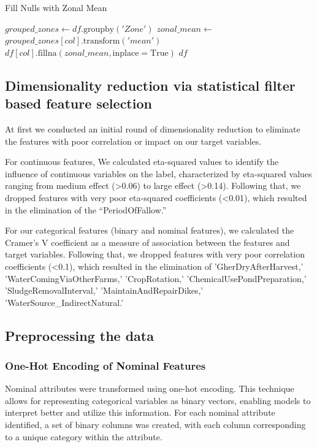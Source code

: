 \documentclass[journal,comsoc]{IEEEtran}
\begin{document}
\begin{algorithm}
\caption{Fill Nulls with Zonal Mean}
\begin{algorithmic}
\State
{}
    \State $grouped\_zones \gets df.\text{groupby}('Zone')$
    \State $zonal\_mean \gets$ \\
    \hspace{5em}$grouped\_zones[col].\text{transform}('mean')$
    \State $df[col].\text{fillna}(zonal\_mean, \text{inplace}=\text{True})$
    \State \Return $df$
\EndFunction
\State
\end{algorithmic}
\end{algorithm}

\subsection{Dimensionality reduction via statistical filter based feature selection}
At first we conducted an initial round of dimensionality reduction to eliminate the features with poor correlation or impact on our target variables. 

For continuous features, We calculated eta-squared values to identify the influence of continuous variables on the label, characterized by eta-squared values ranging from medium effect (\textgreater 0.06) to large effect (\textgreater 0.14). Following that, we dropped features with very poor eta-squared coefficients (\textless 0.01), which resulted in the elimination of the “PeriodOfFallow.”

For our categorical features (binary and nominal features), we calculated the Cramer’s V coefficient as a measure of association between the features and target variables. Following that, we dropped features with very poor correlation coefficients (\textless 0.1), which resulted in the elimination of  'GherDryAfterHarvest,' 'WaterComingViaOtherFarms,' 'CropRotation,' 'ChemicalUsePondPreparation,' 'SludgeRemovalInterval,' 'MaintainAndRepairDikes,' 'WaterSource\_IndirectNatural.'

\subsection{Preprocessing the data}
\subsubsection{One-Hot Encoding of Nominal Features}
Nominal attributes were transformed using one-hot encoding. This technique allows for representing categorical variables as binary vectors, enabling models to interpret better and utilize this information. For each nominal attribute identified, a set of binary columns was created, with each column corresponding to a unique category within the attribute. 
\end{document}
